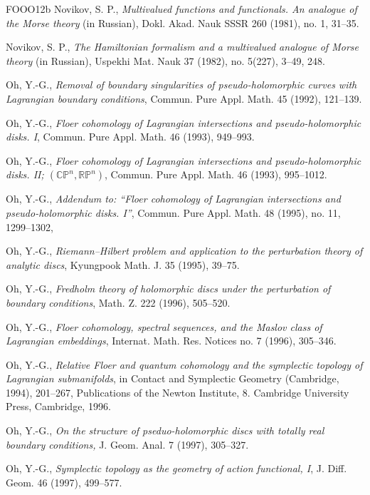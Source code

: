 \begin{thebibliography}{FOOO12b}
 Novikov, S. P., \emph{Multivalued functions and functionals. An analogue of the
  Morse theory} (in Russian), Dokl. Akad. Nauk SSSR 260 (1981), no. 1, 31–35.

 Novikov, S. P., \emph{The Hamiltonian formalism and a multivalued analogue of Morse
  theory} (in Russian), Uspekhi Mat. Nauk 37 (1982), no. 5(227), 3–49, 248.

 Oh, Y.-G., \emph{Removal of boundary singularities of pseudo-holomorphic curves with
  Lagrangian boundary conditions}, Commun. Pure Appl. Math. 45 (1992), 121–139.

 Oh, Y.-G., \emph{Floer cohomology of Lagrangian intersections and
  pseudo-holomorphic disks. I}, Commun. Pure Appl. Math. 46 (1993), 949–993.

 Oh, Y.-G., \emph{Floer cohomology of Lagrangian intersections and
  pseudo-holomorphic disks. II; $(\mathbb{CP}^n,\mathbb{RP}^n)$}, Commun. Pure Appl. Math. 46 (1993),
  995–1012.

 Oh, Y.-G., \emph{Addendum to: “Floer cohomology of Lagrangian intersec\-tions and
  pseudo-holomorphic disks. I”}, Commun. Pure Appl. Math. 48 (1995), no. 11, 1299–1302,

 Oh, Y.-G., \emph{Riemann–Hilbert problem and application to the perturbation
  theory of analytic discs}, Kyungpook Math. J. 35 (1995), 39–75.

 Oh, Y.-G., \emph{Fredholm theory of holomorphic discs under the perturbation of
  boundary conditions}, Math. Z. 222 (1996), 505–520.

 Oh, Y.-G., \emph{Floer cohomology, spectral sequences, and the Maslov class of
  Lagrangian embeddings}, Internat. Math. Res. Notices no. 7 (1996), 305–346.

 Oh, Y.-G., \emph{Relative Floer and quantum cohomology and the symplectic topology
  of Lagrangian submanifolds}, in Contact and Symplectic Geom\-etry (Cambridge, 1994), 201–267,
  Publications of the Newton Institute, 8. Cambridge University Press, Cambridge, 1996.

 Oh, Y.-G., \emph{On the structure of pseduo-holomorphic discs with totally real
  boundary conditions,} J. Geom. Anal. 7 (1997), 305–327.

 Oh, Y.-G., \emph{Symplectic topology as the geometry of action functional, I}, J.
  Diﬀ. Geom. 46 (1997), 499–577.


\end{thebibliography}
